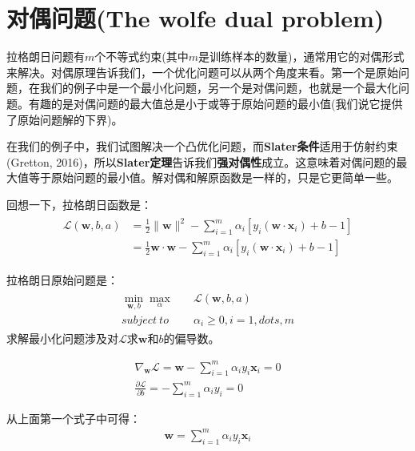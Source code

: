 \section{对偶问题(The wolfe dual problem)}

拉格朗日问题有$m$个不等式约束(其中$m$是训练样本的数量)，通常用它的对偶形式来解决。对偶原理告诉我们，一个优化问题可以从两个角度来看。第一个是原始问题，在我们的例子中是一个最小化问题，另一个是对偶问题，也就是一个最大化问题。有趣的是对偶问题的最大值总是小于或等于原始问题的最小值(我们说它提供了原始问题解的下界)。

在我们的例子中，我们试图解决一个凸优化问题，而\textbf{Slater条件}适用于仿射约束(Gretton, 2016)，所以\textbf{Slater定理}告诉我们\textbf{强对偶性}成立。这意味着对偶问题的最大值等于原始问题的最小值。解对偶和解原函数是一样的，只是它更简单一些。

回想一下，拉格朗日函数是：
\begin{gather*}
\begin{align*}
\mathcal{L}(\mathbf{w},b,a) &= \frac{1}{2}\|\mathbf{w}\|^2-\sum_{i=1}^m \alpha_i [y_i(\mathbf{w}\cdot \mathbf{x}_i)+b-1] \\
&= \frac{1}{2}\mathbf{w} \cdot \mathbf{w}-\sum_{i=1}^m \alpha_i [y_i(\mathbf{w}\cdot \mathbf{x}_i)+b-1]
\end{align*}
\end{gather*}

拉格朗日原始问题是：
\begin{gather*}
\begin{align*}
\min_{\mathbf{w},b} \max_\alpha \quad &\mathcal{L}(\mathbf{w},b,a) \\
subject\ to\quad &\alpha_i \geq 0,i=1,dots,m
\end{align*}
\end{gather*}
求解最小化问题涉及对$\mathcal{L}$求$\mathbf{w}$和$b$的偏导数。

\begin{gather*}
\nabla_\mathbf{w} \mathcal{L} = \mathbf{w} - \sum_{i=1}^m \alpha_i y_i \mathbf{x}_i = 0 \\
\frac{\partial \mathcal{L}}{\partial b}=-\sum_{i=1}^m\alpha_i y_i = 0
\end{gather*}

从上面第一个式子中可得：
\begin{gather*}
\mathbf{w} = \sum_{i=1}^m \alpha_i y_i \mathbf{x}_i
\end{gather*}

